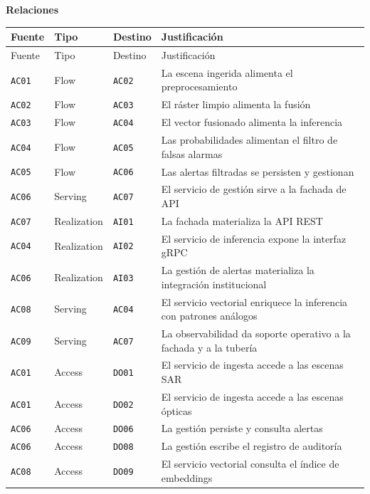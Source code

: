 \documentclass{article}
\newcommand{\mdhfour}[1]{\par\medskip\noindent\textbf{#1}\par\nobreak\smallskip}
\begin{document}
\mdhfour{Relaciones}

{\small
\begin{longtable}{@{}L{0.45in}L{0.82in}L{0.53in}L{4.14in}@{}}
\toprule
Fuente & Tipo & Destino & Justificación \\
\midrule
\endfirsthead
\toprule
Fuente & Tipo & Destino & Justificación \\
\midrule
\endhead
\bottomrule
\endlastfoot
\texttt{AC01} & Flow & \texttt{AC02} & La escena ingerida alimenta el preprocesamiento \\
\texttt{AC02} & Flow & \texttt{AC03} & El ráster limpio alimenta la fusión \\
\texttt{AC03} & Flow & \texttt{AC04} & El vector fusionado alimenta la inferencia \\
\texttt{AC04} & Flow & \texttt{AC05} & Las probabilidades alimentan el filtro de falsas alarmas \\
\texttt{AC05} & Flow & \texttt{AC06} & Las alertas filtradas se persisten y gestionan \\
\texttt{AC06} & Serving & \texttt{AC07} & El servicio de gestión sirve a la fachada de API \\
\texttt{AC07} & Realization & \texttt{AI01} & La fachada materializa la API REST \\
\texttt{AC04} & Realization & \texttt{AI02} & El servicio de inferencia expone la interfaz gRPC \\
\texttt{AC06} & Realization & \texttt{AI03} & La gestión de alertas materializa la integración institucional \\
\texttt{AC08} & Serving & \texttt{AC04} & El servicio vectorial enriquece la inferencia con patrones análogos \\
\texttt{AC09} & Serving & \texttt{AC07} & La observabilidad da soporte operativo a la fachada y a la tubería \\
\texttt{AC01} & Access & \texttt{DO01} & El servicio de ingesta accede a las escenas SAR \\
\texttt{AC01} & Access & \texttt{DO02} & El servicio de ingesta accede a las escenas ópticas \\
\texttt{AC06} & Access & \texttt{DO06} & La gestión persiste y consulta alertas \\
\texttt{AC06} & Access & \texttt{DO08} & La gestión escribe el registro de auditoría \\
\texttt{AC08} & Access & \texttt{DO09} & El servicio vectorial consulta el índice de embeddings \\
\end{longtable}
}
\end{document}
